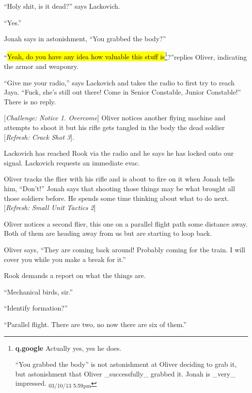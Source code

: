 ``Holy shit, is it dead?'' says Lackovich.

``Yes.''

Jonah says in astonishment, ``You grabbed the body?''

``\hl{Yeah, do you have any idea how valuable this stuff is}\footnote{\textbf{q.google }Actually yes, yes he does.

``You grabbed the body'' is not astonishment at Oliver deciding to grab it, but astonishment that Oliver \_successfully\_ grabbed it.  Jonah is \_very\_ impressed. \textsubscript{03/10/13 5:59pm}}?''replies Oliver, indicating the armor and weaponry.



``Give me your radio,'' says Lackovich and takes the radio to first try to reach Jaya. ``Fuck, she's still out there!  Come in Senior Constable, Junior Constable!''  There is no reply.



{[}\textit{Challenge: Notice 1. Overcome}{]} Oliver notices another flying machine and attempts to shoot it but his rifle gets tangled in the body the dead soldier {[}\textit{Refresh: Crack Shot 3}{]}.



Lackovich has reached Rook via the radio and he says he has locked onto our signal.  Lackovich requests an immediate evac.



Oliver tracks the flier with his rifle and is about to fire on it when Jonah tells him, ``Don't!''  Jonah says that shooting those things may be what brought all those soldiers before.  He spends some time thinking about what to do next. {[}\textit{Refresh: Small Unit Tactics 2}{]}



Oliver notices a second flier, this one on a parallel flight path some distance away. Both of them are heading away from us but are starting to loop back.



Oliver says, ``They are coming back around!  Probably coming for the train.  I will cover you while you make a break for it.''



Rook demands a report on what the things are.  

``Mechanical birds, sir.''

``Identify formation?''

``Parallel flight.  There are two, no now there are six of them.''



